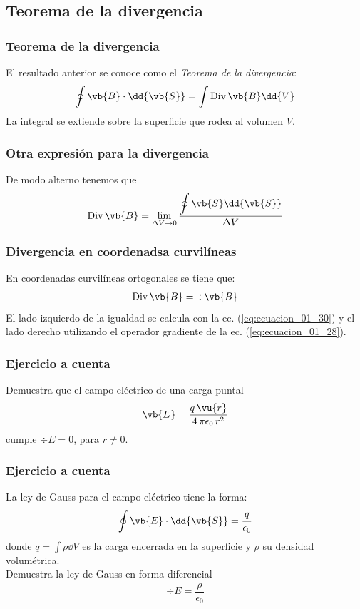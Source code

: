 \subsection{Teorema de la divergencia}
\begin{frame}
\frametitle{Teorema de la divergencia}
El resultado anterior se conoce como el \emph{Teorema de la divergencia}:
\begin{align}
\oint \vb{B} \cdot \dd{\vb{S}} = \int {\rm Div} \, \vb{B} \dd{V}
\label{eq:ecuacion_01_31}
\end{align}
La integral se extiende sobre la superficie que rodea al volumen $V$.
\end{frame}
\begin{frame}
\frametitle{Otra expresión para la divergencia}
De modo alterno tenemos que
\begin{align*}
{\rm Div} \, \vb{B} = \lim_{\Delta V \to 0} \dfrac{\displaystyle \oint \vb{S} \dd{\vb{S}}}{\Delta V}
\end{align*}
\end{frame}
\begin{frame}
\frametitle{Divergencia en coordenadsa curvilíneas}
En coordenadas curvilíneas ortogonales se tiene que:
\begin{align*}
{\rm Div} \, \vb{B} = \div{\vb{B}}
\end{align*}
\pause
El lado izquierdo de la igualdad se calcula con la ec. (\ref{eq:ecuacion_01_30}) y el lado derecho utilizando el operador gradiente de la ec. (\ref{eq:ecuacion_01_28}).
\end{frame}
\begin{frame}
\frametitle{Ejercicio a cuenta}
Demuestra que el campo eléctrico de una carga puntal
\begin{align*}
\vb{E} = \dfrac{q \, \vu{r}}{4 \, \pi \epsilon_{0} \, r^{2}}
\end{align*}
cumple $\div{E} = 0$, para $r \neq 0$.
\end{frame}
\begin{frame}
\frametitle{Ejercicio a cuenta}
La ley de Gauss para el campo eléctrico tiene la forma:
\begin{align*}
\oint \vb{E} \cdot \dd{\vb{S}} = \dfrac{q}{\epsilon_{0}}
\end{align*}
donde $q = \displaystyle \int \rho \dd{V}$ es la carga encerrada en la superficie y $\rho$ su densidad volumétrica.
\\
\bigskip
Demuestra la ley de Gauss en forma diferencial
\begin{align*}
\div{E} = \dfrac{\rho}{\epsilon_{0}}
\end{align*}
\end{frame}
